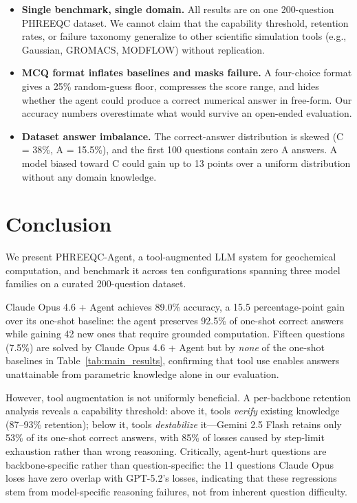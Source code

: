 \documentclass[sigconf,anonymous]{acmart}
\begin{document}
\begin{itemize}[leftmargin=*, itemsep=2pt]

  \item \textbf{Single benchmark, single domain.}
  All results are on one 200-question PHREEQC dataset. We cannot claim that the capability threshold, retention rates, or failure taxonomy generalize to other scientific simulation tools (e.g., Gaussian, GROMACS, MODFLOW) without replication.

  \item \textbf{MCQ format inflates baselines and masks failure.}
  A four-choice format gives a 25\% random-guess floor, compresses the score range, and hides whether the agent could produce a correct numerical answer in free-form. Our accuracy numbers overestimate what would survive an open-ended evaluation.

  \item \textbf{Dataset answer imbalance.}
  The correct-answer distribution is skewed (C = 38\%, A = 15.5\%), and the first 100 questions contain zero A answers. A model biased toward C could gain up to 13 points over a uniform distribution without any domain knowledge.
\end{itemize}


\section{Conclusion}

We present PHREEQC-Agent, a tool-augmented LLM system for geochemical
computation, and benchmark it across ten configurations spanning three
model families on a curated 200-question dataset.

Claude Opus 4.6 + Agent achieves 89.0\% accuracy, a 15.5 percentage-point
gain over its one-shot baseline: the agent preserves 92.5\% of one-shot
correct answers while gaining 42 new ones that require grounded
computation. Fifteen questions (7.5\%) are solved by Claude Opus 4.6 + Agent but by
\emph{none} of the one-shot baselines in Table~\ref{tab:main_results},
confirming that tool use enables answers unattainable from parametric
knowledge alone in our evaluation.

However, tool augmentation is not uniformly beneficial.
A per-backbone retention analysis reveals a capability threshold:
above it, tools \emph{verify} existing knowledge (87--93\% retention);
below it, tools \emph{destabilize} it---Gemini 2.5 Flash retains only
53\% of its one-shot correct answers, with 85\% of losses caused by
step-limit exhaustion rather than wrong reasoning.
Critically, agent-hurt questions are backbone-specific rather than
question-specific: the 11 questions Claude Opus loses have zero overlap
with GPT-5.2's losses, indicating that these regressions stem from
model-specific reasoning failures, not from inherent question difficulty.
\end{document}
